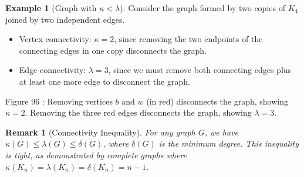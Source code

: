 \documentclass{article}
\newtheorem{remark}{Remark}
\theoremstyle{definition}
\newtheorem{example}{Example}
\begin{document}
\begin{example}[Graph with $\kappa < \lambda$]
Consider the graph formed by two copies of $K_4$ joined by two independent edges.
\begin{itemize}
  \item Vertex connectivity: $\kappa = 2$, since removing the two endpoints of the connecting edges in one copy disconnects the graph.
  \item Edge connectivity: $\lambda = 3$, since we must remove both connecting edges plus at least one more edge to disconnect the graph.
\end{itemize}

\begin{center}

\small Figure 96 : Removing vertices $b$ and $w$ (in red) disconnects the graph, showing $\kappa = 2$. Removing the three red edges disconnects the graph, showing $\lambda = 3$.
\end{center}
\end{example}

\begin{remark}[Connectivity Inequality]
For any graph $G$, we have $\kappa(G) \leq \lambda(G) \leq \delta(G)$, where $\delta(G)$ is the minimum degree. This inequality is tight, as demonstrated by complete graphs where $\kappa(K_n) = \lambda(K_n) = \delta(K_n) = n-1$.
\end{remark}
\end{document}
